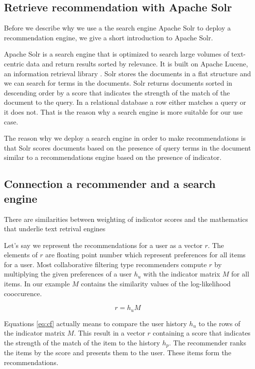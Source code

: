 \subsection{Retrieve recommendation with Apache Solr}
\label{sec:solr}

Before we describe why we use a the search engine Apache Solr to deploy a recommendation engine, we give a short introduction to Apache Solr.

Apache Solr is a search engine that is optimized to search large volumes of text-centric data and return results sorted by relevance. It is built on Apache Lucene, an information retrieval library \cite{grainger}. Solr stores the documents in a flat structure and we can search for terms in the documents.
Solr returns documents sorted in descending order by a score that indicates the strength of the match of the document to the query. In a relational database a row either matches a query or it does not. That is the reason why a search engine is more suitable for our use case.

The reason why we deploy a search engine in order to make recommendations is that Solr scores documents based on the presence of query terms in the document similar to a recommendations engine based on the presence of indicator.

\subsection{Connection a recommender and a search engine}
\label{sec:relation}

There are similarities between weighting of indicator scores and the mathematics that underlie text retrival engines

Let's say we represent the recommendations for a user as a vector $r$. The elements of $r$ are floating point number which represent preferences for all items for a user. Most collaborative filtering type recommenders compute $r$ by multiplying the given preferences of a user $h_u$ with the indicator matrix $M$ for all items. In our example $M$ contains the similarity values of the log-likelihood cooccurence.

\begin{equation}
  \label{eq:cf}
  r = h_u M
\end{equation}

Equations \ref{eq:cf} actually means to compare the user history $h_u$ to the rows of the indicator matrix $M$. This result in a vector $r$ containing a score that indicates the strength of the match of the item to the history $h_p$. The recommender ranks the items by the score and presents them to the user. These items form the recommendations.

